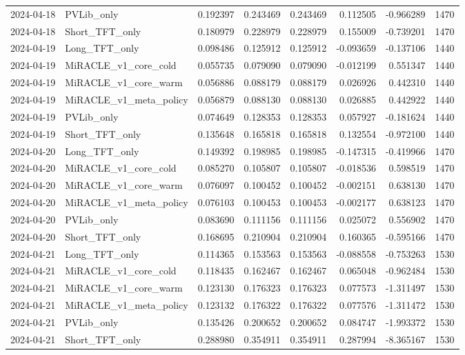 \begin{tabular}{llrrrrrr}
2024-04-18 & PVLib_only & 0.192397 & 0.243469 & 0.243469 & 0.112505 & -0.966289 & 1470 \\
2024-04-18 & Short_TFT_only & 0.180979 & 0.228979 & 0.228979 & 0.155009 & -0.739201 & 1470 \\
2024-04-19 & Long_TFT_only & 0.098486 & 0.125912 & 0.125912 & -0.093659 & -0.137106 & 1440 \\
2024-04-19 & MiRACLE_v1_core_cold & 0.055735 & 0.079090 & 0.079090 & -0.012199 & 0.551347 & 1440 \\
2024-04-19 & MiRACLE_v1_core_warm & 0.056886 & 0.088179 & 0.088179 & 0.026926 & 0.442310 & 1440 \\
2024-04-19 & MiRACLE_v1_meta_policy & 0.056879 & 0.088130 & 0.088130 & 0.026885 & 0.442922 & 1440 \\
2024-04-19 & PVLib_only & 0.074649 & 0.128353 & 0.128353 & 0.057927 & -0.181624 & 1440 \\
2024-04-19 & Short_TFT_only & 0.135648 & 0.165818 & 0.165818 & 0.132554 & -0.972100 & 1440 \\
2024-04-20 & Long_TFT_only & 0.149392 & 0.198985 & 0.198985 & -0.147315 & -0.419966 & 1470 \\
2024-04-20 & MiRACLE_v1_core_cold & 0.085270 & 0.105807 & 0.105807 & -0.018536 & 0.598519 & 1470 \\
2024-04-20 & MiRACLE_v1_core_warm & 0.076097 & 0.100452 & 0.100452 & -0.002151 & 0.638130 & 1470 \\
2024-04-20 & MiRACLE_v1_meta_policy & 0.076103 & 0.100453 & 0.100453 & -0.002177 & 0.638123 & 1470 \\
2024-04-20 & PVLib_only & 0.083690 & 0.111156 & 0.111156 & 0.025072 & 0.556902 & 1470 \\
2024-04-20 & Short_TFT_only & 0.168695 & 0.210904 & 0.210904 & 0.160365 & -0.595166 & 1470 \\
2024-04-21 & Long_TFT_only & 0.114365 & 0.153563 & 0.153563 & -0.088558 & -0.753263 & 1530 \\
2024-04-21 & MiRACLE_v1_core_cold & 0.118435 & 0.162467 & 0.162467 & 0.065048 & -0.962484 & 1530 \\
2024-04-21 & MiRACLE_v1_core_warm & 0.123130 & 0.176323 & 0.176323 & 0.077573 & -1.311497 & 1530 \\
2024-04-21 & MiRACLE_v1_meta_policy & 0.123132 & 0.176322 & 0.176322 & 0.077576 & -1.311472 & 1530 \\
2024-04-21 & PVLib_only & 0.135426 & 0.200652 & 0.200652 & 0.084747 & -1.993372 & 1530 \\
2024-04-21 & Short_TFT_only & 0.288980 & 0.354911 & 0.354911 & 0.287994 & -8.365167 & 1530 \\

\end{tabular}

